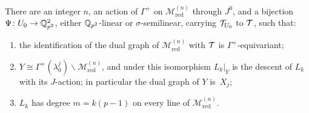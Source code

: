 \begin{lemma}[Uniformization]\label{lem:unif}
\notformalized
There are an integer $n$, an action of $\Gamma^+$ on $\mathcal M^{(n)}_{\mathrm{red}}$ through $J^0$, and a bijection
$\Psi\colon U_0\to\mathbb{Q}_{p^2}^2$, either $\mathbb{Q}_{p^2}$-linear or $\sigma$-semilinear, carrying $\mathcal{T}_{U_0}$ to $\mathcal{T}$, such
that:
\begin{enumerate}[label=(\alph*)]
\item the identification of the dual graph of $\mathcal M^{(n)}_{\mathrm{red}}$ with $\mathcal{T}$ is $\Gamma^+$-equivariant;
\item $Y\cong\Gamma^+(\lambda_0^j)\backslash\mathcal M^{(n)}_{\mathrm{red}}$, and under this isomorphism $L_k|_Y$ is the
descent of $L_k$ with its $J$-action; in particular the dual graph of $Y$ is~$X_j$;
\item $L_k$ has degree $m=k(p-1)$ on every line of $\mathcal M^{(n)}_{\mathrm{red}}$.
\end{enumerate}
\end{lemma}
